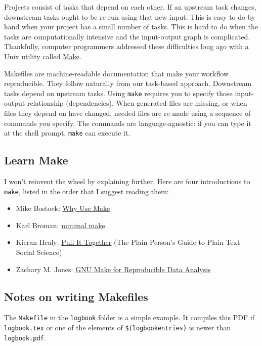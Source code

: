 Projects consist of tasks that depend on each other.
If an upstream task changes, downstream tasks ought to be re-run using that new input.
This is easy to do by hand when your project has a small number of tasks.
This is hard to do when the tasks are computationally intensive and the input-output graph is complicated.
Thankfully, computer programmers addressed these difficulties long ago with a Unix utility called \href{https://en.wikipedia.org/wiki/Make_(software)}{Make}.

Makefiles are machine-readable documentation that make your workflow reproducible.
They follow naturally from our task-based approach.
Downstream tasks depend on upstream tasks.
Using \texttt{make} requires you to specify those input-output relationship (dependencies).
When generated files are missing, or when files they depend on have changed, needed files are re-made using a sequence of commands you specify.
The commands are language-agnostic: if you can type it at the shell prompt, 
\texttt{make} can execute it.

\subsection{Learn Make}

I won't reinvent the wheel by explaining further.
Here are four introductions to \texttt{make}, listed in the order that I suggest reading them:
\begin{itemize}
\item Mike Bostock: \href{https://bost.ocks.org/mike/make/}{Why Use Make}
\item Karl Broman: \href{http://kbroman.org/minimal_make/}{minimal make}
\item Kieran Healy: \href{http://plain-text.co/pull-it-together.html}{Pull It Together} (The Plain Person's Guide to Plain Text Social Science)
\item Zachary M. Jones: \href{http://zmjones.com/make/}{GNU Make for Reproducible Data Analysis}
\end{itemize}

\subsection{Notes on writing Makefiles}

The \texttt{Makefile} in the \texttt{logbook} folder is a simple example.
It compiles this PDF if \texttt{logbook.tex} or one of the elements of \texttt{\$(logbookentries)} is newer than \texttt{logbook.pdf}.

